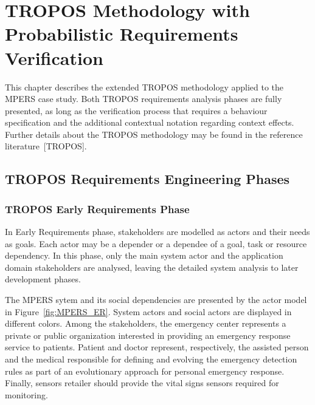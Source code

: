 \chapter{TROPOS Methodology with Probabilistic Requirements Verification}\label{ch:proposal}

This chapter describes the extended TROPOS methodology applied to the MPERS case study. Both TROPOS requirements analysis phases are fully presented, as long as the verification process that requires a behaviour specification and the additional contextual notation regarding context effects. Further details about the TROPOS methodology may be found in the reference literature~[TROPOS]. 

\section{TROPOS Requirements Engineering Phases}

\subsection{TROPOS Early Requirements Phase}

In Early Requirements phase, stakeholders are modelled as actors and their needs as goals. Each actor may be a depender or a dependee of a goal, task or resource dependency. In this phase, only the main system actor and the application domain stakeholders are analysed, leaving the detailed system analysis to later development phases.

The MPERS sytem and its social dependencies are presented by the actor model in Figure~\ref{fig:MPERS_ER}. System actors and social actors are displayed in different colors. Among the stakeholders, the emergency center represents a private or public organization interested in providing an emergency response service to patients. Patient and doctor represent, respectively, the assisted person and the medical responsible for defining and evolving the emergency detection rules as part of an evolutionary approach for personal emergency response. Finally, sensors retailer should provide the vital signs sensors required for monitoring.

